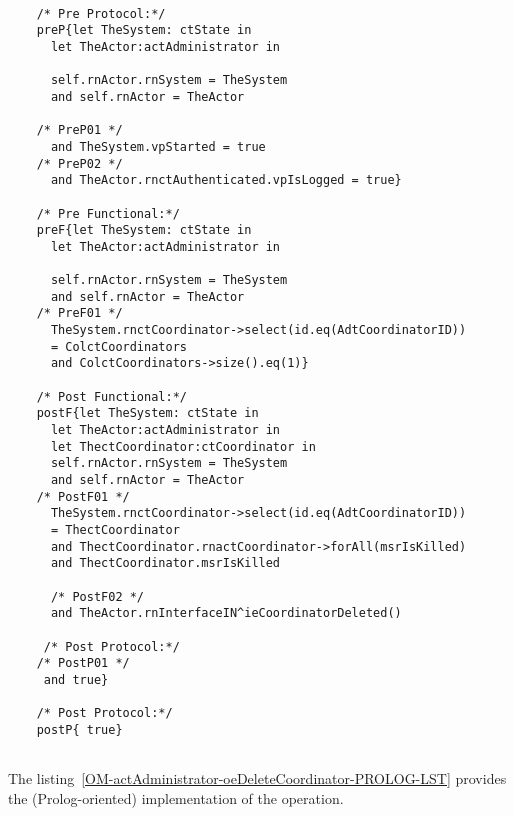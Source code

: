 	\scriptsize
	\vspace{0.5cm}
	\begin{lstlisting}[style=MessirStyle,firstnumber=auto,captionpos=b,caption={\msrmessir (MCL-oriented) specification of the operation \emph{oeDeleteCoordinator}.},label=OM-actAdministrator-oeDeleteCoordinator-MCL-LST]

	/* Pre Protocol:*/ 
	preP{let TheSystem: ctState in
	  let TheActor:actAdministrator in
	  
	  self.rnActor.rnSystem = TheSystem
	  and self.rnActor = TheActor
	  
	/* PreP01 */
	  and TheSystem.vpStarted = true
	/* PreP02 */
	  and TheActor.rnctAuthenticated.vpIsLogged = true}
	
	/* Pre Functional:*/
	preF{let TheSystem: ctState in
	  let TheActor:actAdministrator in
	   
	  self.rnActor.rnSystem = TheSystem
	  and self.rnActor = TheActor
	/* PreF01 */
	  TheSystem.rnctCoordinator->select(id.eq(AdtCoordinatorID))
	  = ColctCoordinators
	  and ColctCoordinators->size().eq(1)}
	
	/* Post Functional:*/ 
	postF{let TheSystem: ctState in
	  let TheActor:actAdministrator in
	  let ThectCoordinator:ctCoordinator in
	  self.rnActor.rnSystem = TheSystem
	  and self.rnActor = TheActor
	/* PostF01 */
	  TheSystem.rnctCoordinator->select(id.eq(AdtCoordinatorID))
	  = ThectCoordinator
	  and ThectCoordinator.rnactCoordinator->forAll(msrIsKilled)
	  and ThectCoordinator.msrIsKilled
	 
	  /* PostF02 */
	  and TheActor.rnInterfaceIN^ieCoordinatorDeleted()
	
	 /* Post Protocol:*/
	/* PostP01 */
	 and true}
	
	/* Post Protocol:*/ 
	postP{ true}
	
	\end{lstlisting}
	\normalsize 
	
	
	
	
	
	\vspace{1cm}
	The listing~\ref{OM-actAdministrator-oeDeleteCoordinator-PROLOG-LST} provides the \msrmessir (Prolog-oriented) implementation of the operation.
	
	\scriptsize
	\vspace{0.5cm}
	
	
	\normalsize





